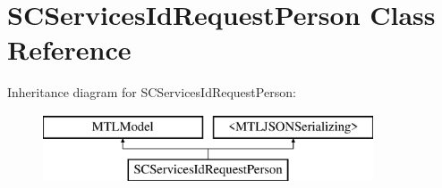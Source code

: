 \hypertarget{interface_s_c_services_id_request_person}{}\section{S\+C\+Services\+Id\+Request\+Person Class Reference}
\label{interface_s_c_services_id_request_person}
Inheritance diagram for S\+C\+Services\+Id\+Request\+Person\+:\begin{figure}[H]
\begin{center}
\leavevmode
\includegraphics[height=2.000000cm]{interface_s_c_services_id_request_person}
\end{center}
\end{figure}
